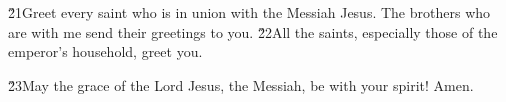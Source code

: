 \v{21}Greet every saint who is in union with the Messiah Jesus. The brothers who are with me send their greetings to you. \v{22}All the saints, especially those of the emperor's household, greet you.

\v{23}May the grace of the Lord Jesus, the Messiah, be with your spirit! Amen.
